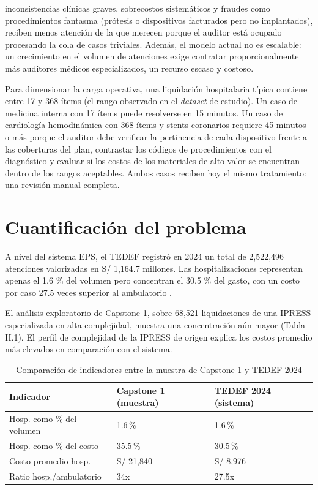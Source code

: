 inconsistencias clínicas graves, sobrecostos sistemáticos y fraudes como procedimientos fantasma (prótesis o dispositivos facturados pero no implantados), reciben menos atención de la que merecen porque el auditor está ocupado procesando la cola de casos triviales. Además, el modelo actual no es escalable: un crecimiento en el volumen de atenciones exige contratar proporcionalmente más auditores médicos especializados, un recurso escaso y costoso.

Para dimensionar la carga operativa, una liquidación hospitalaria típica contiene entre 17 y 368 ítems (el rango observado en el \textit{dataset} de estudio). Un caso de medicina interna con 17 ítems puede resolverse en 15 minutos. Un caso de cardiología hemodinámica con 368 ítems y stents coronarios requiere 45 minutos o más porque el auditor debe verificar la pertinencia de cada dispositivo frente a las coberturas del plan, contrastar los códigos de procedimientos con el diagnóstico y evaluar si los costos de los materiales de alto valor se encuentran dentro de los rangos aceptables. Ambos casos reciben hoy el mismo tratamiento: una revisión manual completa.

\section{Cuantificación del problema}

A nivel del sistema EPS, el TEDEF registró en 2024 un total de 2,522,496 atenciones valorizadas en S/ 1,164.7 millones. Las hospitalizaciones representan apenas el 1.6 \% del volumen pero concentran el 30.5 \% del gasto, con un costo por caso 27.5 veces superior al ambulatorio \cite{susalud2024tedef}.

El análisis exploratorio de Capstone 1, sobre 68,521 liquidaciones de una IPRESS especializada en alta complejidad, muestra una concentración aún mayor (Tabla II.1). El perfil de complejidad de la IPRESS de origen explica los costos promedio más elevados en comparación con el sistema.

\begin{table}[H]
    \centering
    \caption{Comparación de indicadores entre la muestra de Capstone 1 y TEDEF 2024}
    \label{tab:comparacion-capstone-tedef}

    \begin{tabular}{p{} p{} p{}}
        \toprule
        \textbf{Indicador}
        & \textbf{Capstone 1 (muestra)}
        & \textbf{TEDEF 2024 (sistema)} \\
        \midrule
        Hosp. como \% del volumen & 1.6\,\%  & 1.6\,\%  \\
        Hosp. como \% del costo   & 35.5\,\% & 30.5\,\% \\
        Costo promedio hosp.      & S/ 21,840 & S/ 8,976 \\
        Ratio hosp./ambulatorio   & 34x & 27.5x \\
        \bottomrule
    \end{tabular}
\end{table}

